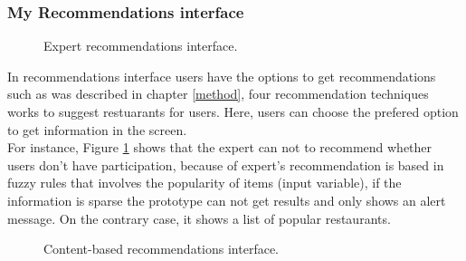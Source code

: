 \subsubsection{My Recommendations interface}

\begin{figure}
\captionsetup{font=footnotesize}
\centering
{}
\caption{Expert recommendations interface.}
\label{fig:expert-recs}   
\end{figure}
In recommendations interface users have the options to get  
recommendations such as was described in chapter \ref{method}, four 
recommendation techniques works to suggest restuarants for 
users. Here, users can choose the prefered option to get 
information in the screen.\\ 
For instance, Figure \ref{fig:expert-recs} shows that the expert can 
not to recommend whether users don't have participation, because of expert's
recommendation is based in fuzzy rules that involves the popularity of
items (input variable), if the information is sparse the prototype can
not get results and only shows an alert message. On the contrary case,
it shows a list of popular restaurants.
\begin{figure}
\captionsetup{font=footnotesize}
\centering
{}
\caption{Content-based recommendations interface.}
\label{fig:base-content}   
\end{figure}
